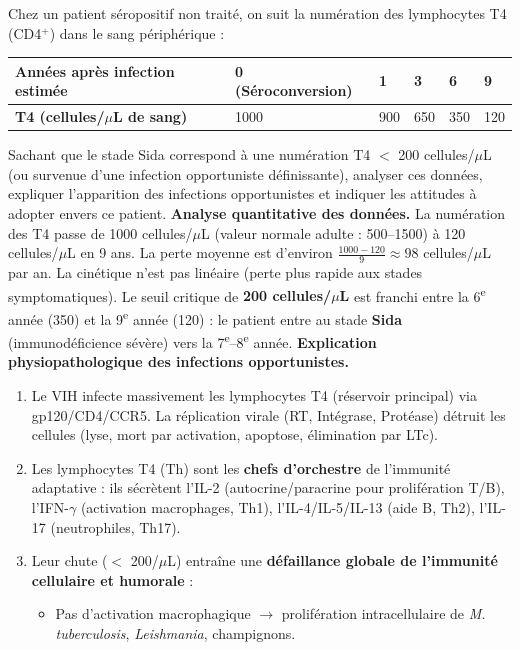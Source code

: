 \documentclass[11pt]{article}
\begin{document}
\begin{exoresolu}
Chez un patient séropositif non traité, on suit la numération des lymphocytes T4 (CD4$^{+}$) dans le sang périphérique :
\begin{center}
\begin{tabularx}{\linewidth}{|l|X|X|X|X|X|}\hline
\rowcolor{popblueL} \textbf{Années après infection estimée} & 0 (Séroconversion) & 1 & 3 & 6 & 9 \\ \hline
\textbf{T4 (cellules/$\mu$L de sang)} & 1000 & 900 & 650 & 350 & 120 \\ \hline
\end{tabularx}
\end{center}
Sachant que le stade Sida correspond à une numération T4 $<$ 200 cellules/$\mu$L (ou survenue d'une infection opportuniste définissante), analyser ces données, expliquer l'apparition des infections opportunistes et indiquer les attitudes à adopter envers ce patient.
\tcblower
\textbf{Analyse quantitative des données.} La numération des T4 passe de \num{1000} cellules/$\mu$L (valeur normale adulte : 500--1500) à \num{120} cellules/$\mu$L en 9 ans. La perte moyenne est d'environ $\frac{1000-120}{9} \approx 98$ cellules/$\mu$L par an. La cinétique n'est pas linéaire (perte plus rapide aux stades symptomatiques). Le seuil critique de \textbf{200 cellules/$\mu$L} est franchi entre la 6\textsuperscript{e} année (350) et la 9\textsuperscript{e} année (120) : le patient entre au stade \textbf{Sida} (immunodéficience sévère) vers la 7\textsuperscript{e}--8\textsuperscript{e} année.
\textbf{Explication physiopathologique des infections opportunistes.}
\begin{enumerate}
\item Le VIH infecte massivement les lymphocytes T4 (réservoir principal) via gp120/CD4/CCR5. La réplication virale (RT, Intégrase, Protéase) détruit les cellules (lyse, mort par activation, apoptose, élimination par LTc).
\item Les lymphocytes T4 (Th) sont les \textbf{chefs d'orchestre} de l'immunité adaptative : ils sécrètent l'IL-2 (autocrine/paracrine pour prolifération T/B), l'IFN-$\gamma$ (activation macrophages, Th1), l'IL-4/IL-5/IL-13 (aide B, Th2), l'IL-17 (neutrophiles, Th17).
\item Leur chute ($<$ 200/$\mu$L) entraîne une \textbf{défaillance globale de l'immunité cellulaire et humorale} : 
\begin{itemize}
\item Pas d'activation macrophagique $\rightarrow$ prolifération intracellulaire de \emph{M. tuberculosis}, \emph{Leishmania}, champignons.

\end{itemize}
\end{enumerate}
\end{exoresolu}
\end{document}
